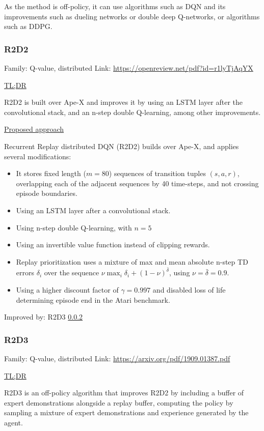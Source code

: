 \documentclass[12pt, english]{article}
\begin{document}
As the method is off-policy, it can use algorithms such as DQN and its improvements such as dueling networks or double deep Q-networks, or algorithms such as DDPG.

\subsubsection{R2D2}
\label{R2D2}

Family: Q-value, distributed
Link: \url{https://openreview.net/pdf?id=r1lyTjAqYX}

\underline{TL;DR}

R2D2 is built over Ape-X and improves it by using an LSTM layer after the convolutional stack, and an n-step double Q-learning, among other improvements.

\underline{Proposed approach}

Recurrent Replay distributed DQN (R2D2) builds over Ape-X, and applies several modifications:

\begin{itemize}
  \item It stores fixed length ($m=80$) sequences of transition tuples $(s,a,r)$, overlapping each of the adjacent sequences by 40 time-steps, and not crossing episode boundaries.
  \item Using an LSTM layer after a convolutional stack.
  \item Using n-step double Q-learning, with $n=5$
  \item Using an invertible value function instead of clipping rewards.
  \item Replay prioritization uses a mixture of max and mean absolute n-step TD errors $\delta_i$ over the sequence $\nu \max_i \delta_i + (1−\nu)^{\bar{\delta}}$, using $\nu=\bar{\delta}=0.9$.
  \item Using a higher discount factor of $\gamma=0.997$ and disabled loss of life determining episode end in the Atari benchmark.
\end{itemize}

Improved by: R2D3 \ref{R2D3}

\subsubsection{R2D3}
\label{R2D3}

Family: Q-value, distributed
Link: \url{https://arxiv.org/pdf/1909.01387.pdf}

\underline{TL;DR}

R2D3 \cite{paine_making_2019} is an off-policy algorithm that improves R2D2 by including a buffer of expert demonstrations alongside a replay buffer, computing the policy by sampling a mixture of expert demonstrations and experience generated by the agent.
\end{document}
